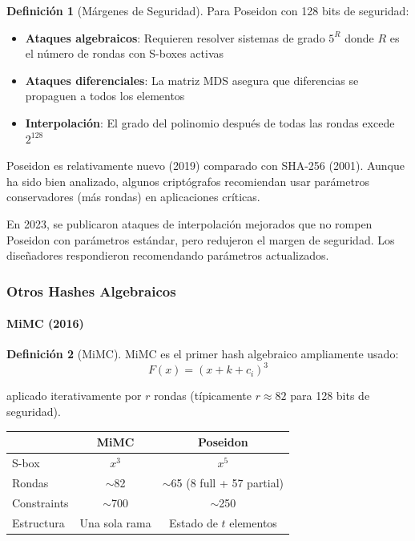 \documentclass[11pt,a4paper,twoside,openright]{book}
\theoremstyle{definition}
\newtheorem{definition}{Definición}[chapter]
\theoremstyle{plain}
\theoremstyle{remark}
\begin{document}
\begin{definition}[Márgenes de Seguridad]
Para Poseidon con 128 bits de seguridad:
\begin{itemize}
    \item \textbf{Ataques algebraicos}: Requieren resolver sistemas de grado $5^{R}$ donde $R$ es el número de rondas con S-boxes activas
    \item \textbf{Ataques diferenciales}: La matriz MDS asegura que diferencias se propaguen a todos los elementos
    \item \textbf{Interpolación}: El grado del polinomio después de todas las rondas excede $2^{128}$
\end{itemize}
\end{definition}

\begin{advertencia}
Poseidon es relativamente nuevo (2019) comparado con SHA-256 (2001). Aunque ha sido bien analizado, algunos criptógrafos recomiendan usar parámetros conservadores (más rondas) en aplicaciones críticas.

En 2023, se publicaron ataques de interpolación mejorados que no rompen Poseidon con parámetros estándar, pero redujeron el margen de seguridad. Los diseñadores respondieron recomendando parámetros actualizados.
\end{advertencia}

\subsubsection{Otros Hashes Algebraicos}

\paragraph{MiMC (2016)}

\begin{definition}[MiMC]
MiMC es el primer hash algebraico ampliamente usado:
\[ F(x) = (x + k + c_i)^3 \]

aplicado iterativamente por $r$ rondas (típicamente $r \approx 82$ para 128 bits de seguridad).
\end{definition}

\begin{center}
\begin{tabular}{lcc}
\toprule
& \textbf{MiMC} & \textbf{Poseidon} \\
\midrule
S-box & $x^3$ & $x^5$ \\
Rondas & $\sim$82 & $\sim$65 (8 full + 57 partial) \\
Constraints & $\sim$700 & $\sim$250 \\
Estructura & Una sola rama & Estado de $t$ elementos \\
\bottomrule
\end{tabular}
\end{center}
\end{document}
